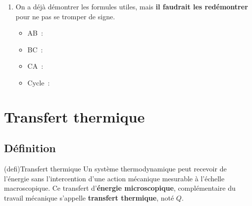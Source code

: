 \documentclass[../../main/main.tex]{subfiles}
\begin{document}
\begin{tcb*}[breakable]
\begin{enumerate}[label=\sqenumi]
\begin{enumerate}[label=\clalphi]
			            \psw{%
				            \[
					            \boxed{P_C = \frac{nRT_C}{V_C}}
					            \Ra
					            \xul{P_C = \SI{2e5}{Pa}}
				            \]
			            }%
		      \end{enumerate}
		\item On a déjà démontrer les formules utiles, mais \textbf{il faudrait
			      les redémontrer} pour ne pas se tromper de signe.
		      \begin{itemize}
			      \item AB~:
			      \item BC~:
			      \item CA~:
			      \item Cycle~:
		      \end{itemize}
	\end{enumerate}
\end{tcb*}

\section{Transfert thermique}
\label{sec:transtherm}
\subsection{Définition}
\begin{tcb*}(defi){Transfert thermique}
	Un système thermodynamique peut recevoir de l'énergie sans l'intercention
	d'une action mécanique mesurable à l'échelle macroscopique. Ce transfert
	d'\textbf{énergie microscopique}, complémentaire du travail mécanique s'appelle
	\textbf{transfert thermique}, noté $Q$.
\end{tcb*}
\end{document}
